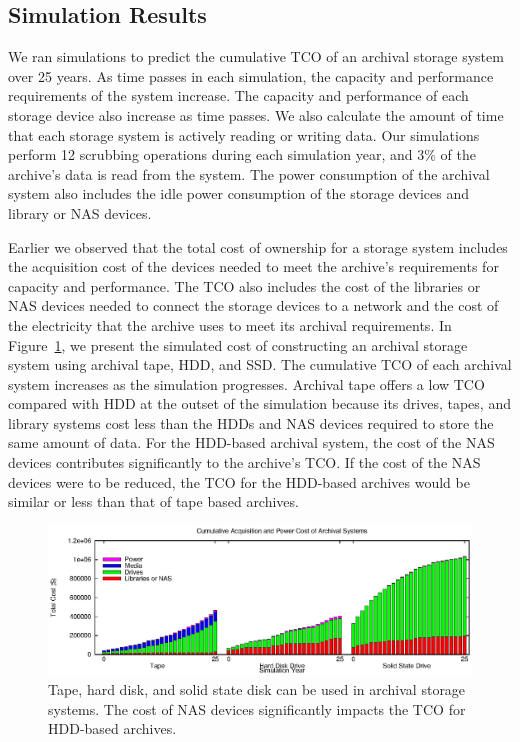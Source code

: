 \subsection{Simulation Results}

We ran simulations to predict the cumulative TCO of an archival storage system over 25 years.  As time passes in each simulation, the capacity and performance requirements of the system increase.  The capacity and performance of each storage device also increase as time passes.  We also calculate the amount of time that each storage system is actively reading or writing data.  Our simulations perform 12 scrubbing operations during each simulation year, and 3\% of the archive's data is read from the system.  The power consumption of the archival system also includes the idle power consumption of the storage devices and library or NAS devices.

Earlier we observed that the total cost of ownership for a storage system includes the acquisition cost of the devices needed to meet the archive's requirements for capacity and performance.  The TCO also includes the cost of the libraries or NAS devices needed to connect the storage devices to a network and the cost of the electricity that the archive uses to meet its archival requirements.  In Figure~\ref{fig1}, we present the simulated cost of constructing an archival storage system using archival tape, HDD, and SSD.  The cumulative TCO of each archival system increases as the simulation progresses.  Archival tape offers a low TCO compared with HDD at the outset of the simulation because its drives, tapes, and library systems cost less than the HDDs and NAS devices required to store the same amount of data.  For the HDD-based archival system, the cost of the NAS devices contributes significantly to the archive's TCO.  If the cost of the NAS devices were to be reduced, the TCO for the HDD-based archives would be similar or less than that of tape based archives.

\begin{figure}[!ht]
\includegraphics[width=\linewidth]{fig1.eps}
\caption{Tape, hard disk, and solid state disk can be used in archival storage systems.  The cost of NAS devices significantly impacts the TCO for HDD-based archives.}
\label{fig1}
\end{figure}

